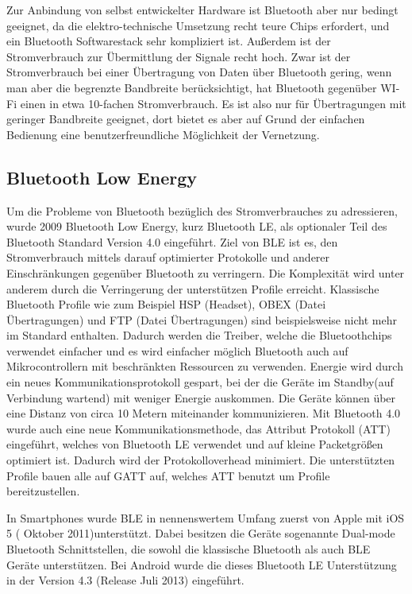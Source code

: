 \documentclass[12pt,journal,compsoc]{IEEEtran}
\begin{document}
Zur Anbindung von selbst entwickelter Hardware ist Bluetooth aber nur bedingt geeignet, da die elektro-technische Umsetzung recht teure Chips erfordert, und ein Bluetooth Softwarestack sehr kompliziert ist. Außerdem ist der Stromverbrauch zur Übermittlung der Signale recht hoch.
Zwar ist der Stromverbrauch bei einer Übertragung von Daten über Bluetooth gering, wenn man aber die begrenzte Bandbreite berücksichtigt, hat Bluetooth gegenüber WI-Fi einen in etwa 10-fachen Stromverbrauch.\cite{wireless}
Es ist also nur für Übertragungen mit geringer Bandbreite geeignet, dort bietet es aber auf Grund der einfachen Bedienung eine benutzerfreundliche Möglichkeit der Vernetzung.

\subsection{Bluetooth Low Energy}
Um die Probleme von Bluetooth bezüglich des Stromverbrauches zu adressieren, wurde 2009 Bluetooth Low Energy, kurz Bluetooth LE, als optionaler Teil des Bluetooth Standard Version 4.0 eingeführt.  
Ziel von BLE ist es, den Stromverbrauch mittels darauf optimierter Protokolle und anderer Einschränkungen gegenüber Bluetooth zu verringern.
Die Komplexität wird unter anderem durch die Verringerung der unterstützen Profile erreicht. Klassische Bluetooth Profile wie zum Beispiel HSP (Headset), OBEX (Datei Übertragungen) und FTP (Datei Übertragungen) sind beispielsweise nicht mehr im Standard enthalten.
Dadurch werden die Treiber, welche die Bluetoothchips verwendet einfacher und es wird einfacher möglich Bluetooth auch auf Mikrocontrollern mit beschränkten Ressourcen zu verwenden.
Energie wird durch ein neues Kommunikationsprotokoll gespart, bei der die Geräte im Standby(auf Verbindung wartend) mit weniger Energie auskommen.
Die Geräte können über eine Distanz von circa 10 Metern miteinander kommunizieren.
Mit Bluetooth 4.0 wurde auch eine neue Kommunikationsmethode, das Attribut Protokoll (ATT) eingeführt, welches von Bluetooth LE verwendet und auf kleine Packetgrößen optimiert ist. 
Dadurch wird der Protokolloverhead minimiert.
Die unterstützten Profile bauen alle auf GATT auf, welches ATT benutzt um Profile bereitzustellen.

In Smartphones wurde BLE in nennenswertem Umfang zuerst von Apple mit iOS 5 ( Oktober 2011)unterstützt.
Dabei besitzen die Geräte sogenannte Dual-mode Bluetooth Schnittstellen, die sowohl die klassische Bluetooth als auch BLE Geräte unterstützen.
Bei Android wurde die dieses Bluetooth LE Unterstützung in der Version 4.3 (Release Juli 2013) eingeführt.
\end{document}
